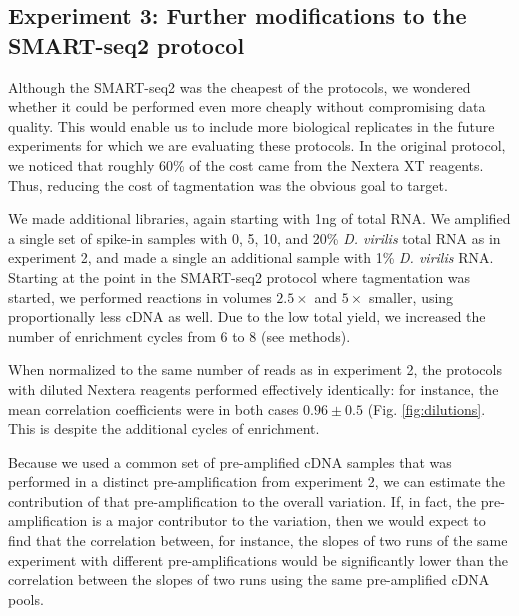 \subsection{Experiment 3: Further modifications to the SMART-seq2 protocol}

Although the SMART-seq2 was the cheapest of the protocols, we wondered whether it could be performed even more cheaply without compromising data quality.  This would enable us to include more biological replicates in the future experiments for which we are evaluating these protocols.  In the original protocol, we noticed that roughly 60\% of the cost came from the Nextera XT reagents.  Thus, reducing the cost of tagmentation was the obvious goal to target.  

We made additional libraries, again starting with 1ng of total RNA.  We amplified a single set of spike-in samples with 0, 5, 10, and 20\% {\em D. virilis} total RNA as in experiment 2, and made a single an additional sample with 1\% {\em D. virilis} RNA. Starting at the point in the SMART-seq2 protocol where tagmentation was started, we performed reactions in volumes $2.5\times$ and $5\times$ smaller, using proportionally less cDNA as well.  Due to the low total yield, we increased the number of enrichment cycles from 6 to 8 (see methods). 

When normalized to the same number of reads as in experiment 2, the protocols with diluted Nextera reagents performed effectively identically: for instance, the mean correlation coefficients were in both cases $0.96 \pm 0.5$ (Fig. \ref{fig:dilutions}.  This is despite the additional cycles of enrichment. 

Because we used a common set of pre-amplified cDNA samples that was performed in a distinct pre-amplification from experiment 2, we can estimate the contribution of that pre-amplification to the overall variation. If, in fact, the pre-amplification is a major contributor to the variation, then we would expect to find that the correlation between, for instance, the slopes of two runs of the same experiment with different pre-amplifications would be significantly lower than the correlation between the slopes of two runs using the same pre-amplified cDNA pools. 